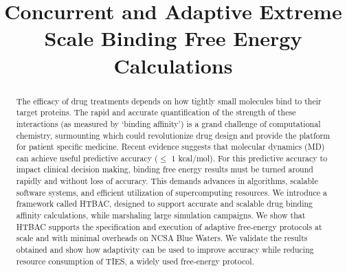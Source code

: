 \documentclass[conference]{IEEEtran}
\begin{document}
\title{Concurrent and Adaptive Extreme Scale Binding Free Energy Calculations}

 \author{
}


\maketitle




\begin{abstract}
The efficacy of drug treatments depends on how tightly small molecules bind
to their target proteins. The rapid and accurate quantification of the
strength of these interactions (as measured by `binding affinity’) is a grand
challenge of computational chemistry, surmounting which could revolutionize
drug design and provide the platform for patient specific medicine. Recent
evidence suggests that molecular dynamics (MD) can achieve useful predictive
accuracy ($\leq$ 1 kcal/mol). For this predictive accuracy to impact clinical
decision making, binding free energy results must be turned around rapidly
and without loss of accuracy. This demands advances in algorithms, scalable
software systems, and efficient utilization of supercomputing resources. We
introduce a framework called HTBAC, designed to support accurate
and scalable drug binding affinity calculations, while marshaling large
simulation campaigns. We show that HTBAC supports the specification and
execution of adaptive free-energy protocols at scale and with minimal
overheads on NCSA Blue Waters. We validate the results obtained and show how
adaptivity can be used to improve accuracy while reducing resource
consumption of TIES, a widely used free-energy protocol.
\end{abstract}



\end{document}
